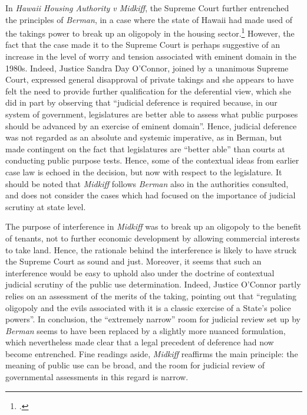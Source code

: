 In {\it Hawaii Housing Authority v Midkiff}, the Supreme Court further entrenched the principles of {\it Berman}, in a case where the state of Hawaii had made used of the takings power to break up an oligopoly in the housing sector.\footcite{midkiff84}  However, the fact that the case made it to the Supreme Court is perhaps suggestive of an increase in the level of worry and tension associated with eminent domain in the 1980s. Indeed, Justice Sandra Day O'Connor, joined by a unanimous Supreme Court, expressed general disapproval of private takings and she appears to have felt the need to provide further qualification for the deferential view, which she did in part by observing that ``judicial deference is required because, in our system of government, legislatures are better able to assess what public purposes should be advanced by an exercise of eminent domain''. Hence, judicial deference was not regarded as an absolute and systemic imperative, as in Berman, but made contingent on the fact that legislatures are ``better able'' than courts at conducting public purpose tests. Hence, some of the contextual ideas from earlier case law is echoed in the decision, but now with respect to the legislature. It should be noted that {\it Midkiff} follows {\it Berman} also in the authorities consulted, and does not consider the cases which had focused on the importance of judicial scrutiny at state level.

The purpose of interference in {\it Midkiff} was to break up an oligopoly to the benefit of tenants, not to further economic development by allowing commercial interests to take land. Hence, the rationale behind the interference is likely to have struck the Supreme Court as sound and just. Moreover, it seems that such an interference would be easy to uphold also under the doctrine of contextual judicial scrutiny of the public use determination. Indeed, Justice O'Connor partly relies on an assessment of the merits of the taking, pointing out that  ``regulating oligopoly and the evils associated with it is a classic exercise of a State's police powers''. In conclusion, the ``extremely narrow'' room for judicial review set up by {\it Berman} seems to have been replaced by a slightly more nuanced formulation, which nevertheless made clear that a legal precedent of deference had now become entrenched. Fine readings aside, {\it Midkiff} reaffirms the main principle:  the meaning of public use can be broad, and the room for judicial review of governmental assessments in this regard is narrow.

